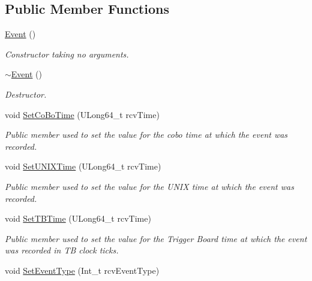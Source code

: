 \subsection*{Public Member Functions}
\begin{DoxyCompactItemize}
\item 
\mbox{\label{classEvent_a5a40dd4708297f7031e29b39e039ae10}} 
\hyperlink{classEvent_a5a40dd4708297f7031e29b39e039ae10}{Event} ()
\begin{DoxyCompactList}\small\item\em Constructor taking no arguments. \end{DoxyCompactList}\item 
\mbox{\label{classEvent_a7704ec01ce91e673885792054214b3d2}} 
\hyperlink{classEvent_a7704ec01ce91e673885792054214b3d2}{$\sim$\+Event} ()
\begin{DoxyCompactList}\small\item\em Destructor. \end{DoxyCompactList}\item 
void \hyperlink{classEvent_a5c49a13db44604d6a0e2f9cd98375044}{Set\+Co\+Bo\+Time} (U\+Long64\+\_\+t rcv\+Time)
\begin{DoxyCompactList}\small\item\em Public member used to set the value for the cobo time at which the event was recorded. \end{DoxyCompactList}\item 
void \hyperlink{classEvent_ac73a250bfe5eb42e8eb74766a42a6973}{Set\+U\+N\+I\+X\+Time} (U\+Long64\+\_\+t rcv\+Time)
\begin{DoxyCompactList}\small\item\em Public member used to set the value for the U\+N\+IX time at which the event was recorded. \end{DoxyCompactList}\item 
void \hyperlink{classEvent_a3ac44ccc4562c58ec07b12d96709e0aa}{Set\+T\+B\+Time} (U\+Long64\+\_\+t rcv\+Time)
\begin{DoxyCompactList}\small\item\em Public member used to set the value for the Trigger Board time at which the event was recorded in TB clock ticks. \end{DoxyCompactList}\item 
void \hyperlink{classEvent_ab084c2b49b15b135cd7a43f1919e4fb9}{Set\+Event\+Type} (Int\+\_\+t rcv\+Event\+Type)

\end{DoxyCompactItemize}
